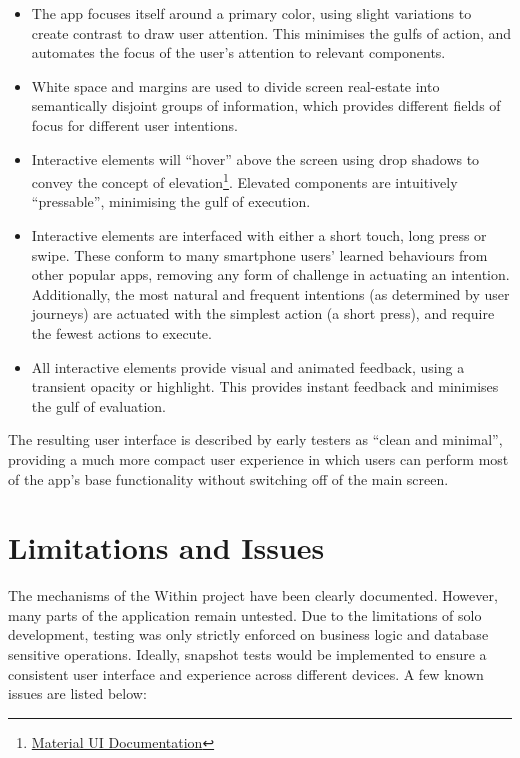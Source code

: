 \begin{itemize}
    \item The app focuses itself around a primary color, using slight variations to create contrast to draw user attention. This minimises the gulfs of action, and automates the focus of the user's attention to relevant components.
    \item White space and margins are used to divide screen real-estate into semantically disjoint groups of information, which provides different fields of focus for different user intentions.
    \item Interactive elements will ``hover'' above the screen using drop shadows to convey the concept of elevation\footnote{\href{https://material.io}{Material UI Documentation}}. Elevated components are intuitively ``pressable'', minimising the gulf of execution.
    \item Interactive elements are interfaced with either a short touch, long press or swipe. These conform to many smartphone users' learned behaviours from other popular apps, removing any form of challenge in actuating an intention. Additionally, the most natural and frequent intentions (as determined by user journeys) are actuated with the simplest action (a short press), and require the fewest actions to execute.
    \item All interactive elements provide visual and animated feedback, using a transient opacity or highlight. This provides instant feedback and minimises the gulf of evaluation.
\end{itemize}

The resulting user interface is described by early testers as ``clean and minimal'', providing a much more compact user experience in which users can perform most of the app's base functionality without switching off of the main screen.

\section{Limitations and Issues}
The mechanisms of the Within project have been clearly documented. However, many parts of the application remain untested. Due to the limitations of solo development, testing was only strictly enforced on business logic and database sensitive operations. Ideally, snapshot tests would be implemented to ensure a consistent user interface and experience across different devices. A few known issues are listed below:

